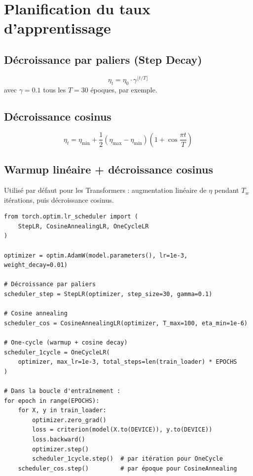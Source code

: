 \section{Planification du taux d'apprentissage}
\label{sec:lr_schedule}

\subsection{D\'ecroissance par paliers (Step Decay)}

\[
\eta_t = \eta_0 \cdot \gamma^{\lfloor t / T \rfloor}
\]
avec $\gamma = 0.1$ tous les $T = 30$ \'epoques, par exemple.

\subsection{D\'ecroissance cosinus}

\[
\eta_t = \eta_{\min} + \frac{1}{2}(\eta_{\max} - \eta_{\min})\left(1 + \cos\frac{\pi t}{T}\right)
\]

\subsection{Warmup lin\'eaire + d\'ecroissance cosinus}

Utilis\'e par d\'efaut pour les Transformers : augmentation lin\'eaire de $\eta$ pendant $T_w$ it\'erations, puis d\'ecroissance cosinus.

\begin{codeblock}[title=\textbf{Planificateurs en PyTorch}]
\begin{verbatim}
from torch.optim.lr_scheduler import (
    StepLR, CosineAnnealingLR, OneCycleLR
)

optimizer = optim.AdamW(model.parameters(), lr=1e-3, weight_decay=0.01)

# Décroissance par paliers
scheduler_step = StepLR(optimizer, step_size=30, gamma=0.1)

# Cosine annealing
scheduler_cos = CosineAnnealingLR(optimizer, T_max=100, eta_min=1e-6)

# One-cycle (warmup + cosine decay)
scheduler_1cycle = OneCycleLR(
    optimizer, max_lr=1e-3, total_steps=len(train_loader) * EPOCHS
)

# Dans la boucle d'entraînement :
for epoch in range(EPOCHS):
    for X, y in train_loader:
        optimizer.zero_grad()
        loss = criterion(model(X.to(DEVICE)), y.to(DEVICE))
        loss.backward()
        optimizer.step()
        scheduler_1cycle.step()  # par itération pour OneCycle
    scheduler_cos.step()         # par époque pour CosineAnnealing
\end{verbatim}
\end{codeblock}


